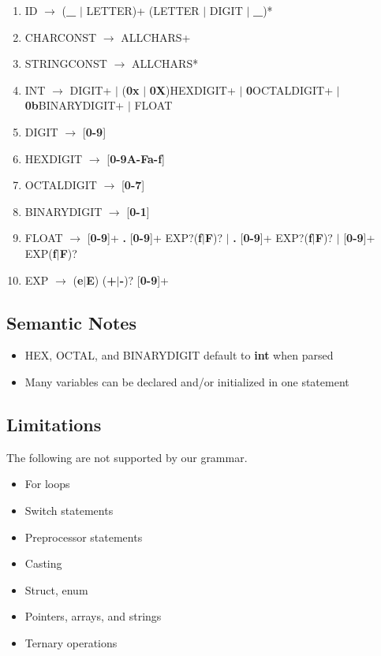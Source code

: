 \documentclass{article}
\begin{document}
\begin{enumerate}
\item ID $\rightarrow$ (\textbf{\_} $|$ LETTER)+ (LETTER $|$ DIGIT $|$ \textbf{\_})*
\item CHARCONST $\rightarrow$ \textbf{\textquotesingle} ALLCHARS+ \textbf{\textquotesingle}
\item STRINGCONST $\rightarrow$ \textbf{\textquotesingle\textquotesingle} ALLCHARS* \textbf{\textquotesingle\textquotesingle}
\item INT $\rightarrow$ DIGIT+ $|$ (\textbf{0x} $|$ \textbf{0X})HEXDIGIT+ $|$ \textbf{0}OCTALDIGIT+ $|$ \textbf{0b}BINARYDIGIT+ $|$ FLOAT
\item DIGIT $\rightarrow$ [\textbf{0-9}]
\item HEXDIGIT $\rightarrow$ [\textbf{0-9A-Fa-f}]
\item OCTALDIGIT $\rightarrow$ [\textbf{0-7}]
\item BINARYDIGIT $\rightarrow$ [\textbf{0-1}]
\item FLOAT $\rightarrow$ [\textbf{0-9}]+ \textbf{.} [\textbf{0-9}]+ EXP?(\textbf{f}$|$\textbf{F})?
    $|$   \textbf{.} [\textbf{0-9}]+ EXP?(\textbf{f}$|$\textbf{F})?
    $|$   [\textbf{0-9}]+ EXP(\textbf{f}$|$\textbf{F})?
\item EXP $\rightarrow$ (\textbf{e}$|$\textbf{E}) (\textbf{+}$|$\textbf{-})? [\textbf{0-9}]+
\end{enumerate}

\subsection{Semantic Notes}
\begin{itemize}
    \item HEX, OCTAL, and BINARYDIGIT default to \textbf{int} when parsed
    \item Many variables can be declared and/or initialized in one statement
    
    
\end{itemize}

\subsection{Limitations}
The following are not supported by our grammar.
\begin{itemize}
    \item For loops
    \item Switch statements
    \item Preprocessor statements
    \item Casting
    \item Struct, enum
    \item Pointers, arrays, and strings
    \item Ternary operations
\end{itemize}
\end{document}
